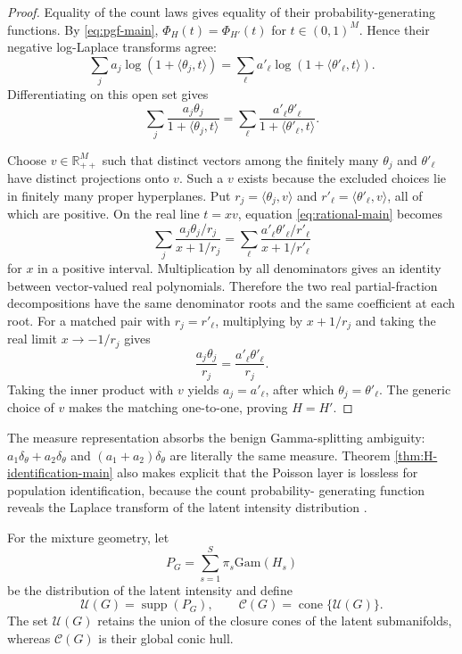\documentclass[11pt]{article}
\newcommand{\R}{\mathbb{R}}
\newcommand{\Gam}{\mathrm{Gam}}
\newcommand{\cone}{\operatorname{cone}}
\theoremstyle{plain}
\theoremstyle{definition}
\begin{document}
\begin{proof}
Equality of the count laws gives equality of their probability-generating
functions.  By \eqref{eq:pgf-main}, $\Phi_H(t)=\Phi_{H'}(t)$ for
$t\in(0,1)^M$.  Hence their negative log-Laplace transforms agree:
\[
  \sum_j a_j\log(1+\langle\theta_j,t\rangle)
  =
  \sum_\ell a'_\ell\log(1+\langle\theta'_\ell,t\rangle).
\]
Differentiating on this open set gives
\begin{equation}
  \sum_j\frac{a_j\theta_j}{1+\langle\theta_j,t\rangle}
  =
  \sum_\ell
  \frac{a'_\ell\theta'_\ell}{1+\langle\theta'_\ell,t\rangle}.
  \label{eq:rational-main}
\end{equation}

Choose $v\in\R_{++}^M$ such that distinct vectors among the finitely many
$\theta_j$ and $\theta'_\ell$ have distinct projections onto $v$.  Such a
$v$ exists because the excluded choices lie in finitely many proper
hyperplanes.  Put $r_j=\langle\theta_j,v\rangle$ and
$r'_\ell=\langle\theta'_\ell,v\rangle$, all of which are positive.  On the
real line $t=xv$, equation \eqref{eq:rational-main} becomes
\[
  \sum_j\frac{a_j\theta_j/r_j}{x+1/r_j}
  =
  \sum_\ell\frac{a'_\ell\theta'_\ell/r'_\ell}{x+1/r'_\ell}
\]
for $x$ in a positive interval.  Multiplication by all denominators gives an
identity between vector-valued real polynomials.  Therefore the two real
partial-fraction decompositions have the same denominator roots and the same
coefficient at each root.  For a matched pair with $r_j=r'_\ell$, multiplying
by $x+1/r_j$ and taking the real limit $x\to-1/r_j$ gives
\[
  \frac{a_j\theta_j}{r_j}
  =\frac{a'_\ell\theta'_\ell}{r_j}.
\]
Taking the inner product with $v$ yields $a_j=a'_\ell$, after which
$\theta_j=\theta'_\ell$.  The generic choice of $v$ makes the matching
one-to-one, proving $H=H'$.
\end{proof}

The measure representation absorbs the benign Gamma-splitting ambiguity:
$a_1\delta_\theta+a_2\delta_\theta$ and
$(a_1+a_2)\delta_\theta$ are literally the same measure.  Theorem
\ref{thm:H-identification-main} also makes explicit that the Poisson layer is
lossless for population identification, because the count probability-
generating function reveals the Laplace transform of the latent intensity
distribution \citep{Teicher1960}.

For the mixture geometry, let
\begin{equation}
  P_G=\sum_{s=1}^{S}\pi_s\Gam(H_s)
  \label{eq:latent-mixture-main}
\end{equation}
be the distribution of the latent intensity and define
\[
  \mathcal U(G)=\operatorname{supp}(P_G),
  \qquad
  \mathcal C(G)=\cone\{\mathcal U(G)\}.
\]
The set $\mathcal U(G)$ retains the union of the closure cones of the latent
submanifolds, whereas $\mathcal C(G)$ is their global conic hull.
\end{document}
